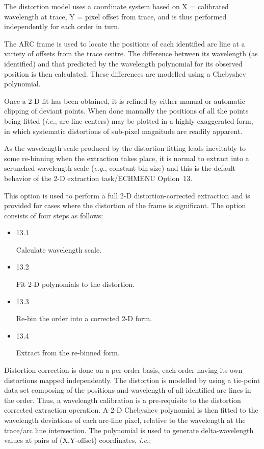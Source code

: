 \documentclass[twoside,11pt]{article}
\renewcommand{\_}{\texttt{\symbol{95}}}
\newcommand{\myindex}[1]{\index{#1}}
\newcommand{\myindex}[1]{}
\begin{document}
The distortion model uses a coordinate system based on X =
calibrated wavelength at trace, Y = pixel offset from trace, and is
thus performed independently for each order in turn.

The ARC frame is used to locate the positions of each identified arc
line at a variety of offsets from the trace centre. The difference
between its wavelength (as identified) and that predicted by the
wavelength polynomial for its observed position is then calculated.
These differences are modelled using a Chebyshev polynomial.

Once a 2-D fit has been obtained,  it is refined by either manual or
automatic clipping of deviant points. When done manually the
positions of all the points being fitted ({\it{i.e.}}, arc line
centers) may be plotted in a highly exaggerated form, in which
systematic distortions of sub-pixel magnitude are readily apparent.

As the wavelength scale produced by the distortion fitting leads
inevitably to some re-binning when the extraction takes place, it is
normal to extract into a scrunched wavelength scale ({\it{e.g.}},
constant bin size) and this is the default behavior of the 2-D
extraction task/ECHMENU Option~13.

This option is used to perform a full 2-D distortion-corrected
extraction and is provided for cases where the distortion of the
frame is significant. The option consists of four steps as follows:

\begin{itemize}

\item {13.1}

      Calculate wavelength scale.

\item {13.2}

      Fit 2-D polynomials to the distortion.

\item {13.3}

      Re-bin the order into a corrected 2-D form.

\item {13.4}

      Extract from the re-binned form.

\end{itemize}

\myindex{Re-binning!2-D}
Distortion correction is done on a per-order basis, each order having its
own distortions mapped independently. The distortion is modelled by using a
tie-point data set composing of the positions and wavelength of all
identified arc lines in the order.
\myindex{Wavelength scales!2-D}
Thus, a wavelength calibration is a pre-requisite to the distortion
corrected extraction operation. A 2-D Chebyshev polynomial is then fitted to
the wavelength deviations of each arc-line pixel, relative to the
wavelength at the trace/arc line intersection. The polynomial is used to
generate delta-wavelength values at pairs of (X,Y-offset) coordinates,
{\it{i.e.}};
\end{document}
